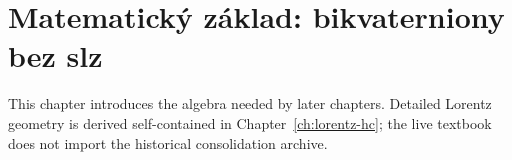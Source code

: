 
\chapter{Matematický základ: bikvaterniony bez slz}
This chapter introduces the algebra needed by later chapters.  Detailed Lorentz geometry is derived self-contained in Chapter~\ref{ch:lorentz-hc}; the live textbook does not import the historical consolidation archive.
